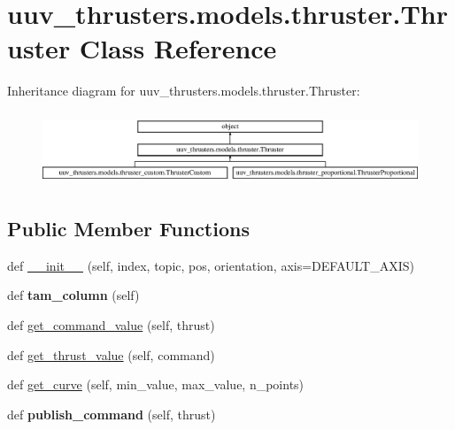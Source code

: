 \hypertarget{classuuv__thrusters_1_1models_1_1thruster_1_1Thruster}{}\section{uuv\+\_\+thrusters.\+models.\+thruster.\+Thruster Class Reference}
\label{classuuv__thrusters_1_1models_1_1thruster_1_1Thruster}
Inheritance diagram for uuv\+\_\+thrusters.\+models.\+thruster.\+Thruster\+:\begin{figure}[H]
\begin{center}
\leavevmode
\includegraphics[height=2.198953cm]{classuuv__thrusters_1_1models_1_1thruster_1_1Thruster}
\end{center}
\end{figure}
\subsection*{Public Member Functions}
\begin{DoxyCompactItemize}
\item 
def \hyperlink{classuuv__thrusters_1_1models_1_1thruster_1_1Thruster_a5d472c0b1187de31ecbecade71fb77e9}{\+\_\+\+\_\+init\+\_\+\+\_\+} (self, index, topic, pos, orientation, axis=D\+E\+F\+A\+U\+L\+T\+\_\+\+A\+X\+IS)
\item 
\mbox{\label{classuuv__thrusters_1_1models_1_1thruster_1_1Thruster_a606b5281acdce060a4d448059e3d2755}} 
def {\bfseries tam\+\_\+column} (self)
\item 
def \hyperlink{classuuv__thrusters_1_1models_1_1thruster_1_1Thruster_a822a77083f976afe5b370555e2cd5f0f}{get\+\_\+command\+\_\+value} (self, thrust)
\item 
def \hyperlink{classuuv__thrusters_1_1models_1_1thruster_1_1Thruster_a8ac586d53fe484de470043b23bd9eded}{get\+\_\+thrust\+\_\+value} (self, command)
\item 
def \hyperlink{classuuv__thrusters_1_1models_1_1thruster_1_1Thruster_a82e413f504f341cbee6b200906045b30}{get\+\_\+curve} (self, min\+\_\+value, max\+\_\+value, n\+\_\+points)
\item 
\mbox{\label{classuuv__thrusters_1_1models_1_1thruster_1_1Thruster_acfa4ed030080803c78ee8cffaadabb84}} 
def {\bfseries publish\+\_\+command} (self, thrust)
\end{DoxyCompactItemize}
